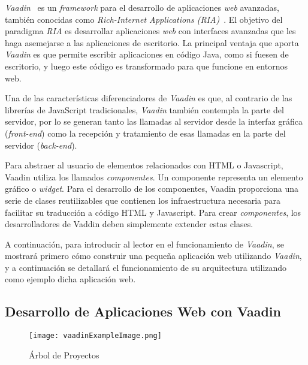 

\emph{Vaadin}~\cite{vaadin} es un \emph{framework} para el desarrollo de aplicaciones \emph{web} avanzadas, también conocidas como \emph{Rich-Internet Applications (RIA)}~\cite{ria}. El objetivo del paradigma \emph{RIA} es desarrollar aplicaciones \emph{web} con interfaces avanzadas que les haga asemejarse a las aplicaciones de escritorio. La principal ventaja que aporta \emph{Vaadin} es que permite escribir aplicaciones en código Java, como si fuesen de escritorio, y luego este código es transformado para que funcione en entornos web.

Una de las características diferenciadores de \emph{Vaadin} es que, al contrario de las librerías de JavaScript tradicionales, \emph{Vaadin} también contempla la parte del servidor, por lo se generan tanto las llamadas al servidor desde la interfaz gráfica (\emph{front-end}) como la recepción y tratamiento de esas llamadas en la parte del servidor (\emph{back-end}).

Para abstraer al usuario de elementos relacionados con HTML o Javascript, Vaadin utiliza los llamados \emph{componentes}. Un componente representa un elemento gráfico o \emph{widget}. Para el desarrollo de los componentes, Vaadin proporciona una serie de clases reutilizables que contienen los infraestructura necesaria para facilitar su traducción a código HTML y Javascript. Para crear \emph{componentes}, los desarrolladores de Vaddin deben simplemente extender estas clases.

A continuación, para introducir al lector en el funcionamiento de \emph{Vaadin}, se mostrará primero cómo construir una pequeña aplicación web utilizando \emph{Vaadin}, y a continuación se detallará el funcionamiento de su arquitectura utilizando como ejemplo dicha aplicación web. 

\subsection{Desarrollo de Aplicaciones Web con Vaadin}

\begin{figure}[H]
	\centering
	\texttt{[image: vaadinExampleImage.png]}
	\caption{Árbol de Proyectos}
	\label{fig:vaadinExampleImage}
\end{figure}

